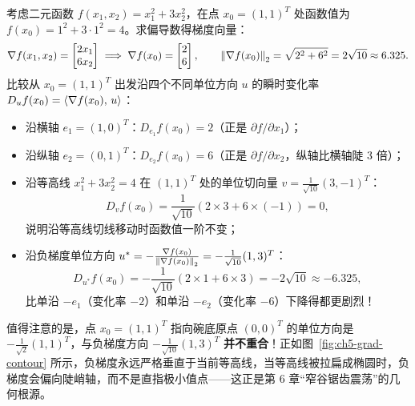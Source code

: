 \begin{example}[二维椭圆碗上的梯度与方向导数]\label{ex:ch5-2d-grad}
考虑二元函数 $f(x_1, x_2) = x_1^2 + 3x_2^2$，在点 $x_0 = (1, 1)^T$ 处函数值为 $f(x_0) = 1^2 + 3\cdot 1^2 = 4$。求偏导数得梯度向量：
\[
  \nabla f(x_1, x_2) = \begin{bmatrix} 2x_1 \\ 6x_2 \end{bmatrix}
  \implies
  \nabla f(x_0) = \begin{bmatrix} 2 \\ 6 \end{bmatrix},
  \qquad
  \left\|\nabla f(x_0)\right\|_2 = \sqrt{2^2 + 6^2} = 2\sqrt{10} \approx 6.325.
\]
比较从 $x_0=(1,1)^T$ 出发沿四个不同单位方向 $u$ 的瞬时变化率 $D_u f(x_0) = \left\langle \nabla f(x_0),\, u \right\rangle$：
\begin{itemize}
  \item 沿横轴 $e_1=(1,0)^T$：$D_{e_1} f(x_0) = 2$（正是 $\partial f/\partial x_1$）；
  \item 沿纵轴 $e_2=(0,1)^T$：$D_{e_2} f(x_0) = 6$（正是 $\partial f/\partial x_2$，纵轴比横轴陡 3 倍）；
  \item 沿等高线 $x_1^2 + 3x_2^2 = 4$ 在 $(1,1)^T$ 处的单位切向量 $v = \frac{1}{\sqrt{10}}(3, -1)^T$：
  \[
    D_v f(x_0) = \frac{1}{\sqrt{10}}(2\times 3 + 6\times(-1)) = 0,
  \]
  说明沿等高线切线移动时函数值一阶不变；
  \item 沿负梯度单位方向 $u^* = -\frac{\nabla f(x_0)}{\left\|\nabla f(x_0)\right\|_2} = -\frac{1}{\sqrt{10}}(1, 3)^T$：
  \[
    D_{u^*} f(x_0) = -\frac{1}{\sqrt{10}}(2\times 1 + 6\times 3) = -2\sqrt{10} \approx -6.325,
  \]
  比单沿 $-e_1$（变化率 $-2$）和单沿 $-e_2$（变化率 $-6$）下降得都更剧烈！
\end{itemize}
值得注意的是，点 $x_0=(1,1)^T$ 指向碗底原点 $(0,0)^T$ 的单位方向是 $-\frac{1}{\sqrt{2}}(1,1)^T$，与负梯度方向 $-\frac{1}{\sqrt{10}}(1,3)^T$ \textbf{并不重合}！正如图~\ref{fig:ch5-grad-contour} 所示，负梯度永远严格垂直于当前等高线，当等高线被拉扁成椭圆时，负梯度会偏向陡峭轴，而不是直指极小值点——这正是第 6 章“窄谷锯齿震荡”的几何根源。
\end{example}


